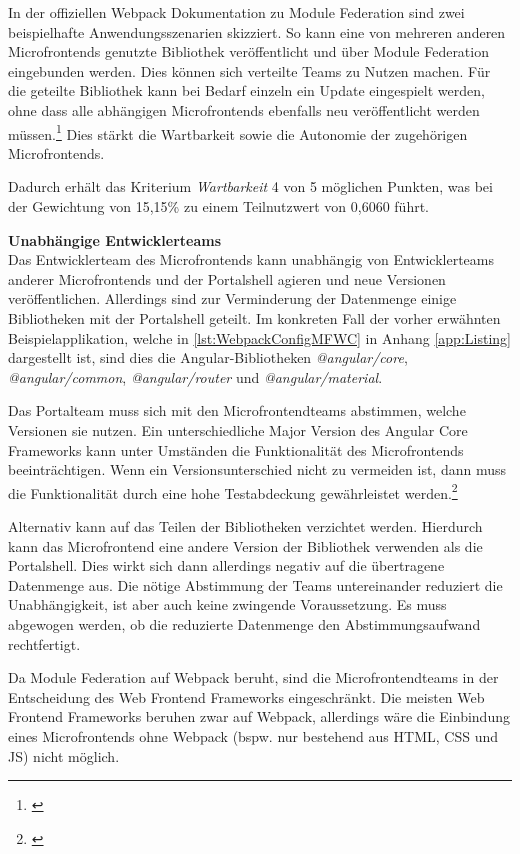 In der offiziellen Webpack Dokumentation zu Module Federation sind zwei beispielhafte Anwendungsszenarien skizziert. So kann eine von mehreren anderen Microfrontends genutzte Bibliothek veröffentlicht und über Module Federation eingebunden werden. Dies können sich verteilte Teams zu Nutzen machen. Für die geteilte Bibliothek kann bei Bedarf einzeln ein Update eingespielt werden, ohne dass alle abhängigen Microfrontends ebenfalls neu veröffentlicht werden müssen.\footnote{\cite[vgl.][]{Webpack2020b}} Dies stärkt die Wartbarkeit sowie die Autonomie der zugehörigen Microfrontends.

Dadurch erhält das Kriterium \textit{Wartbarkeit} 4 von 5 möglichen Punkten, was bei der Gewichtung von 15,15\% zu einem Teilnutzwert von 0,6060 führt.

\textbf{Unabhängige Entwicklerteams}\\
Das Entwicklerteam des Microfrontends kann unabhängig von Entwicklerteams anderer Microfrontends und der Portalshell agieren und neue Versionen veröffentlichen.
Allerdings sind zur Verminderung der Datenmenge einige Bibliotheken mit der Portalshell geteilt. Im konkreten Fall der vorher erwähnten Beispielapplikation, welche in \cref{lst:WebpackConfigMFWC} in Anhang \ref{app:Listing} dargestellt ist, sind dies die Angular-Bibliotheken \textit{@angular/core}, \textit{@angular/common}, \textit{@angular/router} und \textit{@angular/material}. 

Das Portalteam muss sich mit den Microfrontendteams abstimmen, welche Versionen sie nutzen. Ein unterschiedliche Major Version des Angular Core Frameworks kann unter Umständen die Funktionalität des Microfrontends beeinträchtigen. Wenn ein Versionsunterschied nicht zu vermeiden ist, dann muss die Funktionalität durch eine hohe Testabdeckung gewährleistet werden.\footnote{\cite[vgl.][]{Steyer2021a}}

Alternativ kann auf das Teilen der Bibliotheken verzichtet werden. Hierdurch kann das Microfrontend eine andere Version der Bibliothek verwenden als die Portalshell. Dies wirkt sich dann allerdings negativ auf die übertragene Datenmenge aus. Die nötige Abstimmung der Teams untereinander reduziert die Unabhängigkeit, ist aber auch keine zwingende Voraussetzung. Es muss abgewogen werden, ob die reduzierte Datenmenge den Abstimmungsaufwand rechtfertigt.

Da Module Federation auf Webpack beruht, sind die Microfrontendteams in der Entscheidung des Web Frontend Frameworks eingeschränkt. Die meisten Web Frontend Frameworks beruhen zwar auf Webpack, allerdings wäre die Einbindung eines Microfrontends ohne Webpack (bspw. nur bestehend aus \gls{HTML}, \gls{CSS} und \gls{JS}) nicht möglich.

